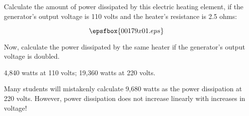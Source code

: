 

Calculate the amount of power dissipated by this electric heating element, if the generator's output voltage is 110 volts and the heater's resistance is 2.5 ohms:

$$\epsfbox{00179x01.eps}$$

Now, calculate the power dissipated by the same heater if the generator's output voltage is doubled.







4,840 watts at 110 volts; 19,360 watts at 220 volts.







Many students will mistakenly calculate 9,680 watts as the power dissipation at 220 volts.  However, power dissipation does not increase linearly with increases in voltage!




